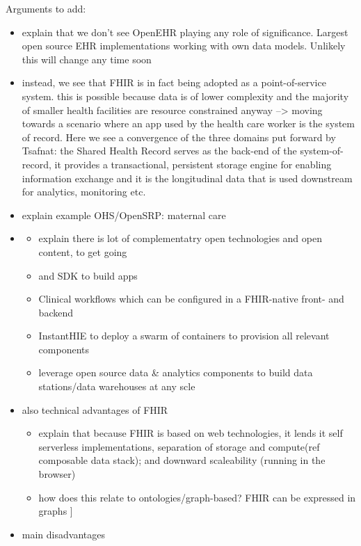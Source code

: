 \documentclass[
  authoryear]{elsarticle}
\providecommand{\tightlist}{%
  \setlength{\itemsep}{0pt}\setlength{\parskip}{0pt}}\usepackage{longtable,booktabs,array}
\begin{document}
Arguments to add:

\begin{itemize}
\tightlist
\item
  explain that we don't see OpenEHR playing any role of significance.
  Largest open source EHR implementations working with own data models.
  Unlikely this will change any time soon
  \citep{syzdykova2017opensource}
\item
  instead, we see that FHIR is in fact being adopted as a
  point-of-service system. this is possible because data is of lower
  complexity and the majority of smaller health facilities are resource
  constrained anyway --\textgreater{} moving towards a scenario where an
  app used by the health care worker is the system of record. Here we
  see a convergence of the three domains put forward by Tsafnat: the
  Shared Health Record serves as the back-end of the system-of-record,
  it provides a transactional, persistent storage engine for enabling
  information exchange and it is the longitudinal data that is used
  downstream for analytics, monitoring etc.
\item
  explain example OHS/OpenSRP: maternal care
\item
  \begin{itemize}
  \tightlist
  \item
    explain there is lot of complementatry open technologies and open
    content, to get going
  \item
    and SDK to build apps
  \item
    Clinical workflows which can be configured in a FHIR-native front-
    and backend
  \item
    InstantHIE to deploy a swarm of containers to provision all relevant
    components
  \item
    leverage open source data \& analytics components to build data
    stations/data warehouses at any scle
  \end{itemize}
\item
  also technical advantages of FHIR

  \begin{itemize}
  \tightlist
  \item
    explain that because FHIR is based on web technologies, it lends it
    self serverless implementations, separation of storage and
    compute(ref composable data stack); and downward scaleability
    (running in the browser)
  \item
    how does this relate to ontologies/graph-based? FHIR can be
    expressed in graphs \citep{gebreslassie2023fhir4fair}{]}
  \end{itemize}
\item
  main disadvantages


\end{itemize}
\end{document}
